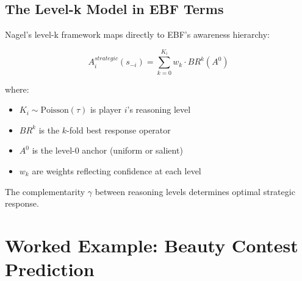\subsection{The Level-k Model in EBF Terms}

Nagel's level-k framework maps directly to EBF's awareness hierarchy:

\begin{equation}
A_i^{strategic}(s_{-i}) = \sum_{k=0}^{K_i} w_k \cdot BR^k(A^0)
\end{equation}

where:
\begin{itemize}[nosep]
    \item $K_i \sim \text{Poisson}(\tau)$ is player $i$'s reasoning level
    \item $BR^k$ is the $k$-fold best response operator
    \item $A^0$ is the level-0 anchor (uniform or salient)
    \item $w_k$ are weights reflecting confidence at each level
\end{itemize}

The complementarity $\gamma$ between reasoning levels determines optimal strategic response.

\section{Worked Example: Beauty Contest Prediction}

